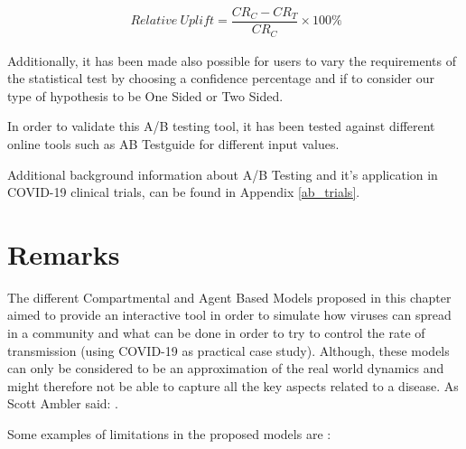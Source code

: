 \useshortskip
\begin{align}
\ Relative\:Uplift = \dfrac{CR_{C} - CR_{T}}{CR_{C}}\times100\%
\label{uplift}
\end{align}
\useshortskip

Additionally, it has been made also possible for users to vary the requirements of the statistical test by choosing a confidence percentage and if to consider our type of hypothesis to be One Sided or Two Sided. 

In order to validate this A/B testing tool, it has been tested against different online tools such as AB Testguide \cite{check_live} for different input values.

Additional background information about A/B Testing and it's application in COVID-19 clinical trials, can be found in Appendix \ref{ab_trials}.

\section{Remarks}
The different Compartmental and Agent Based Models proposed in this chapter aimed to provide an interactive tool in order to simulate how viruses can spread in a community and what can be done in order to try to control the rate of transmission (using COVID-19 as practical case study). Although, these models can only be considered to be an approximation of the real world dynamics and might therefore not be able to capture all the key aspects related to a disease. As Scott Ambler \cite{scott} said: .

Some examples of limitations in the proposed models are \cite{sri_ex}:

